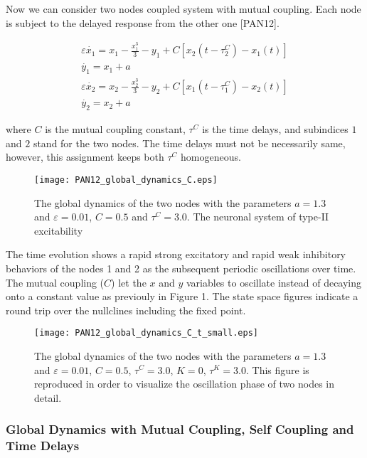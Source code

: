 \documentclass[12pt]{article}
\begin{document}
Now we can consider two nodes coupled system with mutual coupling. Each node is subject to the delayed response from the other one [PAN12]. 

\begin{subequations} \begin{align} \varepsilon  \dot{x_1} = x_1 - \frac{x_1^3}{3} -y_1  + C [x_2(t-\tau_2^C)-x_1(t)] \label{eqn: frobenius 10}\\  \dot{y_1} = x_1+a \label{eqn: frobenius 11}  \\ \varepsilon  \dot{x_2} = x_2 - \frac{x_2^3}{3} -y_2  + C [x_1(t-\tau_1^C)-x_2(t)] \label{eqn: frobenius 12}  \\  \dot{y_2} = x_2+a \label{eqn: frobenius 13} 
\end{align} 
\end{subequations}

where $C$ is the mutual coupling constant, $\tau^C$ is the time delays, and subindices $1$ and $2$ stand for the two nodes. The time delays must not be necessarily same, however, this assignment keeps both $\tau^C$ homogeneous.

\begin{figure}[h!]
	\centering
	\texttt{[image: PAN12\_global\_dynamics\_C.eps]}
		\caption{The global dynamics of the two nodes with the parameters $a=1.3$ and $\varepsilon = 0.01$, $C=0.5$ and $\tau^C= 3.0$. The neuronal system of type-II excitability}
\end{figure}

\newpage 
 The time evolution shows a rapid strong excitatory and rapid weak inhibitory behaviors of the nodes 1 and 2 as the subsequent periodic oscillations over time. The mutual coupling ($C$) let the $x$ and $y$ variables to oscillate instead of decaying onto a constant value as previouly in Figure 1. The state space figures indicate a round trip over the nullclines including the fixed point.
 
\begin{figure}[h!]
	\centering
	\texttt{[image: PAN12\_global\_dynamics\_C\_t\_small.eps]}
		\caption{The global dynamics of the two nodes with the parameters $a=1.3$ and $\varepsilon = 0.01$, $C=0.5$, $\tau^C= 3.0$, $K=0$, $\tau^K= 3.0$. This figure is reproduced in order to visualize the oscillation phase of two nodes in detail.}
\end{figure} 
 
\subsubsection{Global Dynamics with Mutual Coupling, Self Coupling and Time Delays}
\end{document}
